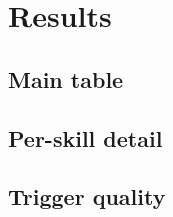 \section{Results}
\label{sec:results}

%
%

\subsection{Main table}


\subsection{Per-skill detail}

\subsection{Trigger quality}
%

